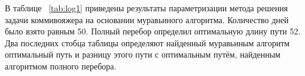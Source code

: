 \documentclass[12pt]{report}
\begin{document}
В таблице ~\ref{tab:log1} приведены результаты параметризации метода решения задачи коммивояжера на основании муравьиного алгоритма. Количество дней было взято равным 50. Полный перебор определил оптимальную длину пути 52. Два последних стобца таблицы определяют найденный муравьиным алгоритм оптимальный путь и разницу этого пути с оптимальным путём, найденным алгоритмом полного перебора.

\begin{table}
    \caption{Таблица коэффициентов для класса данных 1.}
    \begin{minipage}[h!]{0.10\hsize}\centering
        \begin{center}
\end{center}
\end{minipage}
\end{table}
\end{document}
